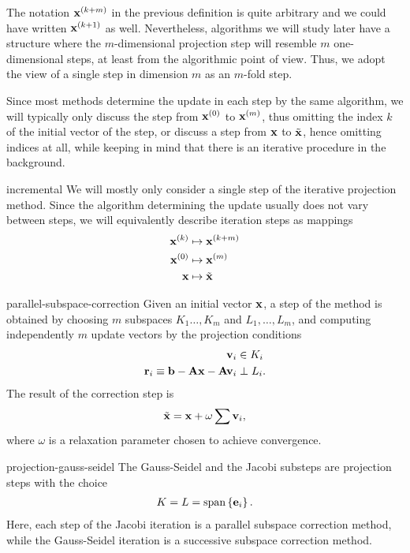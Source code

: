 \begin{remark}
  The notation $\mathbf x^{(k+m)}$ in the previous definition is quite
  arbitrary and we could have written $\mathbf x^{(k+1)}$ as
  well. Nevertheless, algorithms we will study later have a structure
  where the $m$-dimensional projection step will resemble $m$
  one-dimensional steps, at least from the algorithmic point of
  view. Thus, we adopt the view of a single step in dimension $m$ as
  an $m$-fold step.

  Since most methods determine the update in each step by the same
  algorithm, we will typically only discuss the step from $\mathbf x^{(0)}$
  to $\mathbf x^{(m)}$, thus omitting the index $k$ of the initial vector of
  the step, or discuss a step from $\mathbf x$ to $\tilde{\mathbf x}$, hence
  omitting indices at all, while keeping in mind that there is an
  iterative procedure in the background.
\end{remark}

\begin{Notation}{incremental}
  We will mostly only consider a single step of the iterative
  projection method. Since the algorithm determining the update
  usually does not vary between steps, we will equivalently describe
  iteration steps as mappings
  \begin{align*}
    \mathbf x^{(k)} &\mapsto \mathbf x^{(k+m)}\\
    \mathbf x^{(0)} &\mapsto \mathbf x^{(m)}\\
    \mathbf x &\mapsto \tilde{\mathbf x}
  \end{align*}
\end{Notation}

\begin{Definition}{parallel-subspace-correction}
  Given an initial vector $\mathbf x$, a step of the  method is obtained by choosing $m$ subspaces
  $K_1\dots,K_m$ and $L_1,\dots,L_m$, and computing independently $m$
  update vectors by the projection conditions
  \begin{align}
    \mathbf v_i &\in K_i\\
    \mathbf r_i \equiv \mathbf b-\mathbf A\mathbf x - \mathbf A\mathbf v_i &\perp L_i.
  \end{align}
  The result of the correction step is
  \begin{gather}
    \tilde {\mathbf x} = \mathbf x + \omega\sum\mathbf v_i,
  \end{gather}
  where $\omega$ is a relaxation parameter chosen to achieve convergence.
\end{Definition}

\begin{Example}{projection-gauss-seidel}
  The Gauss-Seidel and the Jacobi substeps are projection steps with the choice
  \begin{gather}
    K=L=\operatorname{span}\left\{\mathbf e_i\right\}.
  \end{gather}
  Here, each step of the Jacobi iteration is a parallel subspace
  correction method, while the Gauss-Seidel iteration is a successive
  subspace correction method.
\end{Example}

